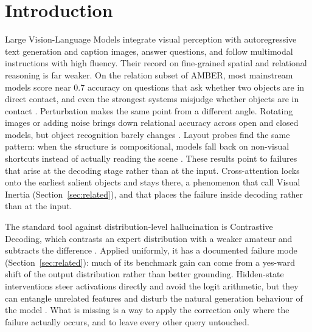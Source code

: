 \documentclass[pdflatex,sn-basic,Numbered]{sn-jnl}
\theoremstyle{thmstyleone}
\theoremstyle{thmstyletwo}
\theoremstyle{thmstylethree}
\begin{document}

\maketitle

\section{Introduction}\label{sec:intro}

Large Vision-Language Models integrate visual perception with autoregressive text generation \cite{liu2023visual} and caption images, answer questions, and follow multimodal instructions with high fluency. Their record on fine-grained spatial and relational reasoning is far weaker. On the relation subset of AMBER, most mainstream models score near 0.7 accuracy on questions that ask whether two objects are in direct contact, and even the strongest systems misjudge whether objects are in contact \cite{wang2023amber}. Perturbation makes the same point from a different angle. Rotating images or adding noise brings down relational accuracy across open and closed models, but object recognition barely changes \cite{shin2026when}. Layout probes find the same pattern: when the structure is compositional, models fall back on non-visual shortcuts instead of actually reading the scene \cite{brown2025hallucination}. These results point to failures that arise at the decoding stage rather than at the input. Cross-attention locks onto the earliest salient objects and stays there, a phenomenon that \cite{gong2026attention} call Visual Inertia (Section~\ref{sec:related}), and that places the failure inside decoding rather than at the input.

The standard tool against distribution-level hallucination is Contrastive Decoding, which contrasts an expert distribution with a weaker amateur and subtracts the difference \cite{leng2024mitigating}. Applied uniformly, it has a documented failure mode (Section~\ref{sec:related}): much of its benchmark gain can come from a yes-ward shift of the output distribution rather than better grounding. Hidden-state interventions steer activations directly and avoid the logit arithmetic, but they can entangle unrelated features and disturb the natural generation behaviour of the model \cite{su2025activation,zhang2026mitigating}. What is missing is a way to apply the correction only where the failure actually occurs, and to leave every other query untouched.
\end{document}
